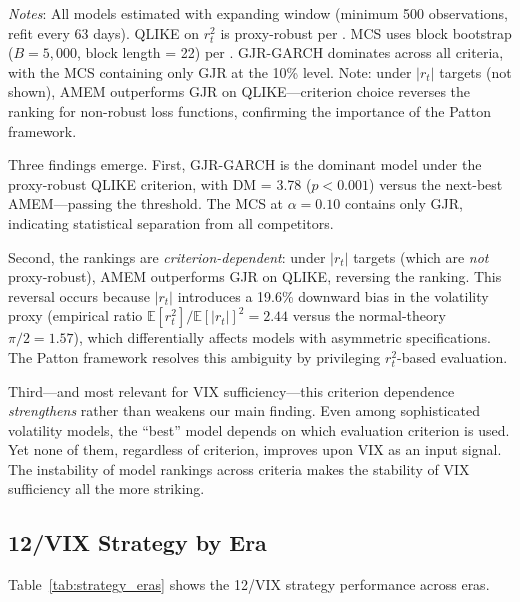 \documentclass[12pt,a4paper]{article}
\begin{document}
\begin{table}[H]
\begin{threeparttable}
\begin{tablenotes}
\small
\item \textit{Notes}: All models estimated with expanding window (minimum 500 observations, refit every 63 days). QLIKE on $r_t^2$ is proxy-robust per \citet{patton2011}. MCS uses block bootstrap ($B = 5{,}000$, block length = 22) per \citet{hansen2011mcs}. GJR-GARCH dominates across all criteria, with the MCS containing only GJR at the 10\% level. Note: under $|r_t|$ targets (not shown), AMEM outperforms GJR on QLIKE---criterion choice reverses the ranking for non-robust loss functions, confirming the importance of the Patton framework.
\end{tablenotes}
\end{threeparttable}
\end{table}

Three findings emerge. First, GJR-GARCH is the dominant model under the proxy-robust QLIKE criterion, with DM = 3.78 ($p < 0.001$) versus the next-best AMEM---passing the \citet{harvey2016} threshold. The MCS at $\alpha = 0.10$ contains only GJR, indicating statistical separation from all competitors.

Second, the rankings are \emph{criterion-dependent}: under $|r_t|$ targets (which are \emph{not} proxy-robust), AMEM outperforms GJR on QLIKE, reversing the ranking. This reversal occurs because $|r_t|$ introduces a 19.6\% downward bias in the volatility proxy (empirical ratio $\mathbb{E}[r_t^2]/\mathbb{E}[|r_t|]^2 = 2.44$ versus the normal-theory $\pi/2 = 1.57$), which differentially affects models with asymmetric specifications. The Patton framework resolves this ambiguity by privileging $r_t^2$-based evaluation.

Third---and most relevant for VIX sufficiency---this criterion dependence \emph{strengthens} rather than weakens our main finding. Even among sophisticated volatility models, the ``best'' model depends on which evaluation criterion is used. Yet none of them, regardless of criterion, improves upon VIX as an input signal. The instability of model rankings across criteria makes the stability of VIX sufficiency all the more striking.

\subsection{12/VIX Strategy by Era}

Table~\ref{tab:strategy_eras} shows the 12/VIX strategy performance across eras.
\end{document}
